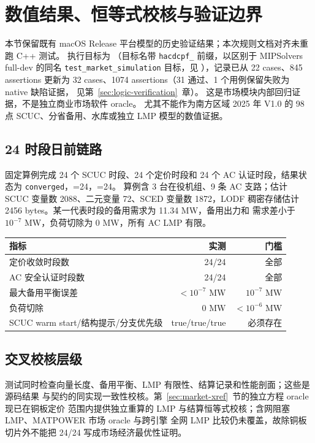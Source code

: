 \section{数值结果、恒等式校核与验证边界}\label{sec:market-numerical}

本节保留既有 macOS Release 平台模型的历史验证结果；本次规则文档对齐未重跑 C++ 测试。
执行目标为 （目标名带
\texttt{hacdcpf\_} 前缀，以区别于 MIPSolvers full-dev 的同名 \texttt{test\_market\_simulation}
目标，见 ），记录已从 22 cases、845 assertions 更新为
32 cases、1074 assertions（31 通过、1 个用例保留失败为 native 缺陷证据，
见第~\ref{sec:logic-verification}~章）。
这是市场模块内部回归证据，不是独立商业市场软件 oracle。
尤其不能作为南方区域 2025 年 V1.0 的 98 点 SCUC、分省备用、水库或独立 LMP 模型的数值证据。

\subsection{24 时段日前链路}
固定算例完成 24 个 SCUC 时段、24 个定价时段和 24 个 AC 认证时段，结果状态为
\texttt{converged}，=24，=24。
算例含 3 台在役机组、9 条 AC 支路；估计 SCUC 变量数 2088、二元变量 72、SCED 变量数
1872，LODF 稠密存储估计 2456 bytes。某一代表时段的备用需求为 11.34 MW，备用出力和
需求差小于 $10^{-7}$ MW，负荷切除为 0 MW，所有 AC LMP 有限。

\begin{center}\small
\begin{tabular}{@{}L{6.0cm}rr@{}}
\toprule 指标 & 实测 & 门槛\\\midrule
定价收敛时段数 & 24/24 & 全部\\
AC 安全认证时段数 & 24/24 & 全部\\
最大备用平衡误差 & $<10^{-7}$ MW & $10^{-7}$ MW\\
负荷切除 & 0 MW & $<10^{-6}$ MW\\
SCUC warm start/结构提示/分支优先级 & true/true/true & 必须存在\\
\bottomrule
\end{tabular}
\end{center}

\subsection{交叉校核层级}
测试同时检查向量长度、备用平衡、LMP 有限性、结算记录和性能剖面；这些是源码结果
与契约的同实现一致性校核。第~\ref{sec:market-xref}~节的独立方程 oracle 现已在铜板定价
范围内提供独立重算的 LMP 与结算恒等式校核；含网阻塞 LMP、MATPOWER 市场 oracle 与跨引擎
全网 LMP 比较仍未覆盖，故除铜板切片外不能把 24/24 写成市场经济最优性证明。


